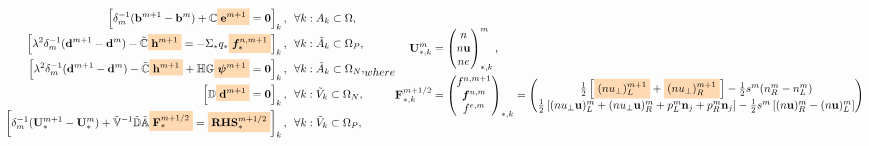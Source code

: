 \documentclass{article}
\newcommand{\mycolorbox}[2]{\colorbox{#1}{$\displaystyle#2$}}
\begin{document}
\begin{subequations}
\begin{align}
    \left[\delta_m^{-1} (\mathbf{b}^{m+1} - \mathbf{b}^{m}) + \mathbb{C}\mycolorbox{orange!30}{\mathbf{e}^{m+1}} = \mathbf{0} \right]_k,\ \ &\forall k:A_k \subset \Omega, \label{equ:maxwell_faraday_ap}\\
    \left[\lambda^2\delta_m^{-1}(\mathbf{d}^{m+1} - \mathbf{d}^m)- \Tilde{\mathbb{C}}\mycolorbox{orange!30}{\mathbf{h}^{m+1}} = - \Sigma_\ast q_\ast \mycolorbox{orange!30}{\bm{f}^{n,m+1}_{\ast}}\right]_k,\ \ &\forall k:\Tilde{A}_k\subset\Omega_P, \label{equ:maxwell_ampere_plasma_ap}\\
    \left[\lambda^2\delta_m^{-1}(\mathbf{d}^{m+1} - \mathbf{d}^m)- \Tilde{\mathbb{C}}\mycolorbox{orange!30}{\mathbf{h}^{m+1}} + \mathbb{H}\mathbb{G}\mycolorbox{orange!30}{\bm{\psi}^{m+1}} = \mathbf{0} \right]_k,\ \ &\forall k:\Tilde{A}_k\subset\Omega_N, \label{equ:maxwell_ampere_nonconducting_ap}\\
    \left[\mathbb{D}\mycolorbox{orange!30}{\mathbf{d}^{m+1}} = \mathbf{0}\right]_k, \ \ &\forall k : \Tilde{V}_k \subset \Omega_N, \label{equ:gauss_nonconducting_ap} \\
    \left[\delta_m^{-1}(\mathbf{U}_{*}^{m+1} - \mathbf{U}_{*}^{m}) + \mathbb{\Tilde{V}}^{-1}\mathbb{\Tilde{D}}\mathbb{\Tilde{A}}\mycolorbox{orange!30}{\mathbf{F}_\ast^{m+1/2}} = \mycolorbox{orange!30}{\mathbf{RHS}_\ast^{m+1/2}} \right]_k,\ \ &\forall k : \Tilde{V}_k \subset \Omega_P, \label{equ:euler_ap}
\end{align}
where 
\begin{align}
    \mathbf{U}_{*,k}^{m} &=
    \begin{pmatrix}
    n \\
    n \mathbf{u} \\
    n e
    \end{pmatrix}^m_{\ast,k}, \\
    \mathbf{F}_{*,k}^{m+1/2} &=
    \begin{pmatrix}
    f^{n,m+1} \\
    \bm{f}^{u,m} \\
    f^{e,m}
    \end{pmatrix}_{\ast,k}
    = 
    \begin{pmatrix}
    \frac{1}{2}\left[\mycolorbox{orange!30}{(nu_{\bot})_{L}^{m+1}} + \mycolorbox{orange!30}{(nu_{\bot})_{R}^{m+1}}\right] - \frac{1}{2}s^m(n_{R}^m - n_{L}^m) \\
    \frac{1}{2}\left[(nu_{\bot}\mathbf{u})^m_{L} + (nu_{\bot}\mathbf{u})^m_{R} + p_{L}^m\mathbf{n}_j + p_{R}^m\mathbf{n}_j\right] - \frac{1}{2}s^m\left[(n\mathbf{u})^m_{R} - (n\mathbf{u})^m_{L}\right] \\

\end{pmatrix}
\end{align}
\end{subequations}
\end{document}
